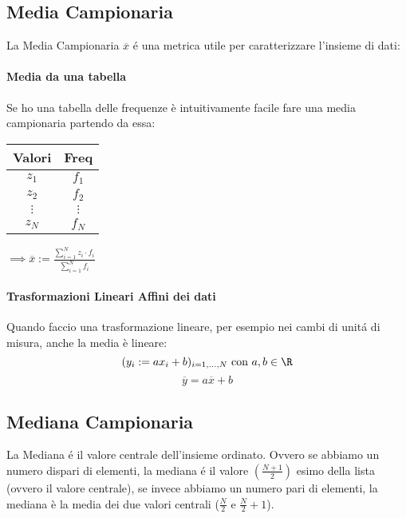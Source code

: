 \subsection{Media Campionaria}
La Media Campionaria $\overline{x}$ é una metrica utile per caratterizzare l'insieme di dati:

\paragraph{Media da una tabella}
Se ho una tabella delle frequenze è intuitivamente facile fare una media campionaria partendo da essa:
\begin{center}
    \begin{tabular}{ c|c }
        Valori & Freq\\
        \hline
        $z_1$& $f_1$ \\
        $z_2$& $f_2$ \\
        $\vdots$ & $\vdots$ \\
        $z_N$& $f_N$ 
    \end{tabular}
    $ \implies \overline{x} := \frac{\sum_{i=1}^{N} z_i \cdot f_i}{\sum_{i=1}^{N} f_i}$
\end{center}

\paragraph{Trasformazioni Lineari Affini dei dati}
Quando faccio una trasformazione lineare, per esempio nei cambi di unitá di misura, anche la media è lineare:
$$ (y_i := a x_i + b)_{i=1,...,N} \text{ con } a,b \in \R $$
$$ \overline{y} = a \overline{x} + b $$


\subsection{Mediana Campionaria}
La Mediana é il valore centrale dell'insieme ordinato.
Ovvero se abbiamo un numero dispari di elementi, la mediana é il valore $(\frac{N+1}{2})$ esimo della lista (ovvero il valore centrale), se invece abbiamo
un numero pari di elementi, la mediana è la media dei due valori centrali ($\frac{N}{2}$ e $\frac{N}{2}+1$).

